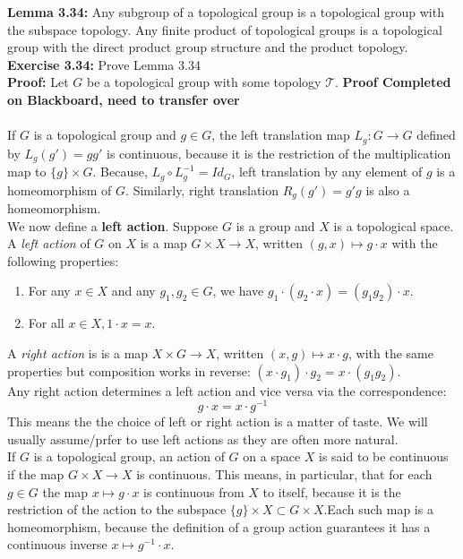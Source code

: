 \documentclass{article}
\begin{document}
  \textbf{Lemma 3.34:} Any subgroup of a topological group is a topological group with the subspace topology. Any finite product of topological groups is a topological group with the direct product group structure and the product topology.\\

  \textbf{Exercise 3.34:} Prove Lemma 3.34\\
  \textbf{Proof:} Let \(G\) be a topological group with some topology \(\mathcal{T}\). \textbf{Proof Completed on Blackboard, need to transfer over}\\
  \\
  If \(G\) is a topological group and \(g\in G\), the left translation map \(L_g:G\to G\) defined by \(L_g(g')=gg'\) is continuous, because it is the restriction of the multiplication map to \(\{g\}\times G\). Because, \(L_g\circ L_g^{-1}=Id_G\), left translation by any element of \(g\) is a homeomorphism of \(G\). Similarly, right translation \(R_g(g')=g'g\) is also a homeomorphism.\\
  We now define a \textbf{left action}. Suppose \(G\) is a group and \(X\) is a topological space. A \textit{left action} of \(G\) on \(X\) is a map \(G\times X\to X\), written \((g,x)\mapsto g\cdot x\) with the following properties:
  \begin{enumerate}[label=(\Roman*.)]
      \item For any \(x\in X\) and any \(g_1,g_2\in G\), we have \(g_1\cdot (g_2\cdot x)=(g_1g_2)\cdot x\).
      \item For all \(x\in X, 1\cdot x=x\).
  \end{enumerate} 
  A \textit{right action} is is a map \(X\times G\to X\), written \((x,g)\mapsto x\cdot g\), with the same properties but composition works in reverse: \((x\cdot g_1)\cdot g_2=x\cdot (g_1g_2)\).\\
  Any right action determines a left action and vice versa via the correspondence:\[
  g\cdot x=x\cdot g^{-1}
  \]
  This means the the choice of left or right action is a matter of taste. We will usually assume/prfer to use left actions as they are often more natural.\\
  If \(G\) is a topological group, an action of \(G\) on a space \(X\) is said to be continuous if the map \(G\times X\to X\) is continuous. This means, in particular, that for each \(g\in G\) the map \(x\mapsto g\cdot x\) is continuous from \(X\) to itself, because it is the restriction of the action to the subspace \(\{g\}\times X\subset G\times X\).Each such map is a homeomorphism, because the definition of a group action guarantees it has a continuous inverse \(x\mapsto g^{-1}\cdot x\).\\
\end{document}
